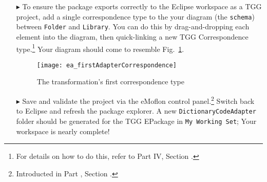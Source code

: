 \begin{itemize}

\item[$\blacktriangleright$] To ensure the package exports correctly to the Eclipse workspace as a TGG project, add a single correspondence type to the
your diagram (the \texttt{schema}) between \texttt{Folder} and \texttt{Library}. You can do this by drag-and-dropping each element into the diagram,
then quick-linking a new TGG Correspondence type.\footnote{For details on how to do this, refer to Part IV, Section \update.} Your diagram should come to
resemble Fig.~\ref{ea:firstCorrType}.

\vspace{0.5cm}

\begin{figure}[htpb]
\begin{center}
  \texttt{[image: ea\_firstAdapterCorrespondence]}
  \caption{The transformation's first correspondence type}
  \label{ea:firstCorrType}
\end{center}
\end{figure}

\vspace{0.5cm}

\item[$\blacktriangleright$] Save and validate the project via the eMoflon control panel.\footnote{Introducted in Part \update, Section \update.} Switch back
to Eclipse and refresh the package explorer. A new \texttt{Dict\-ion\-ary\-Code\-Adap\-ter} folder should be generated for the TGG EPackage in \texttt{My
Working Set}; Your workspace is nearly complete!


\end{itemize}
